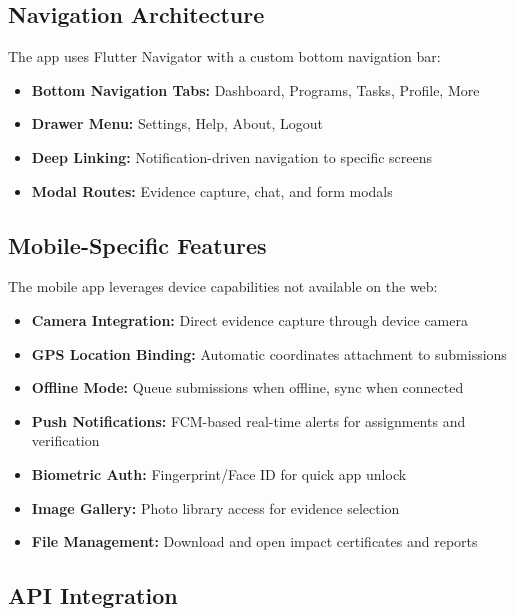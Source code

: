 \documentclass[11pt,a4paper]{article}
\begin{document}
\subsection{Navigation Architecture}

The app uses Flutter Navigator with a custom bottom navigation bar:

\begin{itemize}
  \item \textbf{Bottom Navigation Tabs:} Dashboard, Programs, Tasks, Profile, More
  \item \textbf{Drawer Menu:} Settings, Help, About, Logout
  \item \textbf{Deep Linking:} Notification-driven navigation to specific screens
  \item \textbf{Modal Routes:} Evidence capture, chat, and form modals
\end{itemize}

\subsection{Mobile-Specific Features}

The mobile app leverages device capabilities not available on the web:

\begin{itemize}
  \item \textbf{Camera Integration:} Direct evidence capture through device camera
  \item \textbf{GPS Location Binding:} Automatic coordinates attachment to submissions
  \item \textbf{Offline Mode:} Queue submissions when offline, sync when connected
  \item \textbf{Push Notifications:} FCM-based real-time alerts for assignments and verification
  \item \textbf{Biometric Auth:} Fingerprint/Face ID for quick app unlock
  \item \textbf{Image Gallery:} Photo library access for evidence selection
  \item \textbf{File Management:} Download and open impact certificates and reports
\end{itemize}

\subsection{API Integration}
\end{document}
